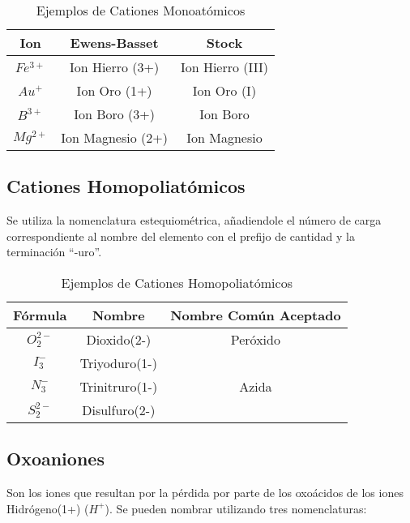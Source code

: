 \documentclass[11pt,fleqn]{book} %
\begin{document}
\begin{table}[h!]
	\centering\begin{tabular}{c|cc}
		Ion&Ewens-Basset&Stock \\ \hline
		$Fe^{3+}$&Ion Hierro (3+)&Ion Hierro (III)\\
		$Au^{+}$&Ion Oro (1+)&Ion Oro (I)\\
		$B^{3+}$&Ion Boro (3+)&Ion Boro\\
		$Mg^{2+}$&Ion Magnesio (2+)&Ion Magnesio \\ \hline
	\end{tabular}
	\caption{Ejemplos de Cationes Monoatómicos}
\end{table}
\subsection{Cationes Homopoliatómicos}
Se utiliza la nomenclatura estequiométrica, añadiendole el número de carga correspondiente al nombre del elemento con el prefijo de cantidad y la terminación “-uro”.
\begin{table}[h!]
	\centering
	\begin{tabular}{c|cc}
		Fórmula&Nombre&Nombre Común Aceptado\\ \hline
		$O_{2}^{2-}$&Dioxido(2-)&Peróxido\\
		$I_{3}^{-}$&Triyoduro(1-)&\\
		$N_{3}^{-}$&Trinitruro(1-)&Azida\\
		$S_{2}^{2-}$&Disulfuro(2-)&\\ \hline
	\end{tabular}
		\caption{Ejemplos de Cationes Homopoliatómicos}
\end{table}

\subsection{Oxoaniones}
Son los iones que resultan por la pérdida por parte de los oxoácidos de los iones Hidrógeno(1+) ($H^{+}$). Se pueden nombrar utilizando tres nomenclaturas:\\
\end{document}
